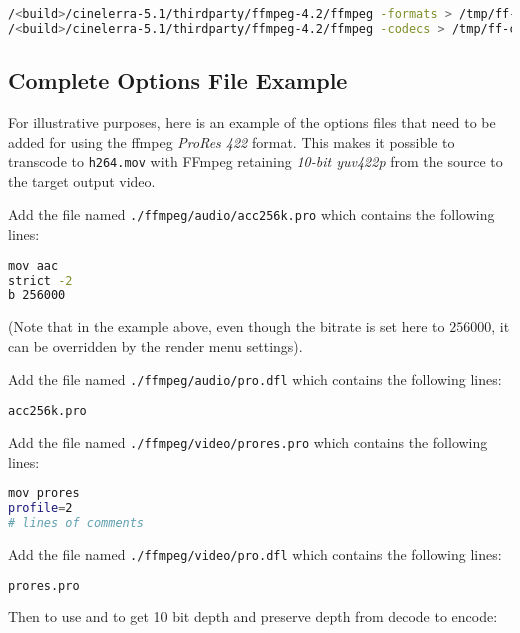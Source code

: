 \begin{lstlisting}[language=bash,numbers=none]
/<build>/cinelerra-5.1/thirdparty/ffmpeg-4.2/ffmpeg -formats > /tmp/ff-formats.txt
/<build>/cinelerra-5.1/thirdparty/ffmpeg-4.2/ffmpeg -codecs > /tmp/ff-codecs.txt
\end{lstlisting}

\subsection{Complete Options File Example}%
\label{sub:complete_options_file_example}

For illustrative purposes, here is an example of the options files that need to be added for using the ffmpeg \textit{ProRes 422} format. This makes it possible to transcode to \texttt{h264.mov} with FFmpeg retaining \textit{10-bit yuv422p} from the source to the target output video.

Add the file named  \texttt{./ffmpeg/audio/acc256k.pro} which contains the following lines:

\begin{lstlisting}[language=bash,numbers=none]
mov aac
strict -2
b 256000
\end{lstlisting}

(Note that in the example above, even though the bitrate is set here to $256000$, it can be 	overridden by the render menu settings).

Add the file named \texttt{./ffmpeg/audio/pro.dfl} which contains the following lines:

\begin{lstlisting}[language=bash,numbers=none]
acc256k.pro
\end{lstlisting}

Add the file named \texttt{./ffmpeg/video/prores.pro} which contains the following lines:

\begin{lstlisting}[language=bash,numbers=none]
mov prores
profile=2
# lines of comments
\end{lstlisting}

Add the file named \texttt{./ffmpeg/video/pro.dfl} which contains the following lines:

\begin{lstlisting}[language=bash,numbers=none]
prores.pro
\end{lstlisting}

Then to use and to get 10 bit depth and preserve depth from decode to encode:

